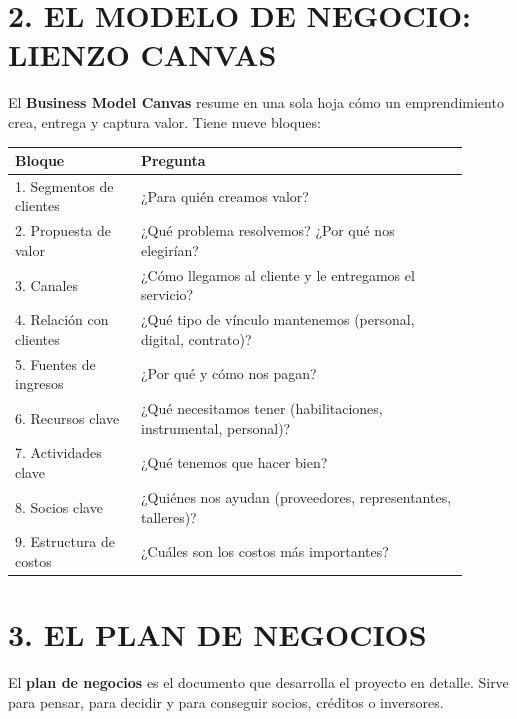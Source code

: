 \section*{2. EL MODELO DE NEGOCIO: LIENZO CANVAS}

El \textbf{Business Model Canvas} resume en una sola hoja cómo un emprendimiento crea,
entrega y captura valor. Tiene nueve bloques:

\begin{center}
\small
\begin{tabular}{|p{0.25\linewidth}|p{0.65\linewidth}|}
\hline
\textbf{Bloque} & \textbf{Pregunta} \\ \hline
1. Segmentos de clientes & ¿Para quién creamos valor? \\ \hline
2. Propuesta de valor & ¿Qué problema resolvemos? ¿Por qué nos elegirían? \\ \hline
3. Canales & ¿Cómo llegamos al cliente y le entregamos el servicio? \\ \hline
4. Relación con clientes & ¿Qué tipo de vínculo mantenemos (personal, digital, contrato)? \\ \hline
5. Fuentes de ingresos & ¿Por qué y cómo nos pagan? \\ \hline
6. Recursos clave & ¿Qué necesitamos tener (habilitaciones, instrumental, personal)? \\ \hline
7. Actividades clave & ¿Qué tenemos que hacer bien? \\ \hline
8. Socios clave & ¿Quiénes nos ayudan (proveedores, representantes, talleres)? \\ \hline
9. Estructura de costos & ¿Cuáles son los costos más importantes? \\ \hline
\end{tabular}
\end{center}

\section*{3. EL PLAN DE NEGOCIOS}

El \textbf{plan de negocios} es el documento que desarrolla el proyecto en detalle. Sirve para
pensar, para decidir y para conseguir socios, créditos o inversores.

